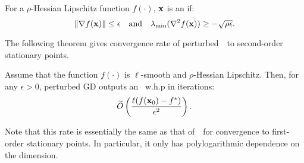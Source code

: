 \begin{definition}\label{def:SOSP}
For a $\rho$-Hessian Lipschitz function $f(\cdot)$, $\mathbf{x}$ is an \textbf{\ESSP} if:
\begin{equation*}
\left\|{\nabla f(\mathbf{x})}\right\| \le \epsilon \quad\text{and}\quad \lambda_{\min}(\nabla^2 f(\mathbf{x})) \ge - \sqrt{\rho \epsilon}.
\end{equation*}
\end{definition}
\noindent
The following theorem gives convergence rate of perturbed~\gd~to second-order stationary points.
\begin{theorem}\label{thm:perturbed_GD}
Assume that the function $f(\cdot)$ is $\ell$-smooth and $\rho$-Hessian Lipschitz. Then, for any $\epsilon>0$, perturbed GD outputs an \ESSP ~w.h.p in iterations:
\begin{equation*}
\widetilde{O}\left({\frac{\ell(f(\mathbf{x}_0) - f^*)}{\epsilon^2}}\right).
\end{equation*}
\end{theorem}
\noindent
Note that this rate is essentially the same as that of~\gd~for convergence to first-order stationary points. In particular, it only has polylogarithmic dependence on the dimension.
